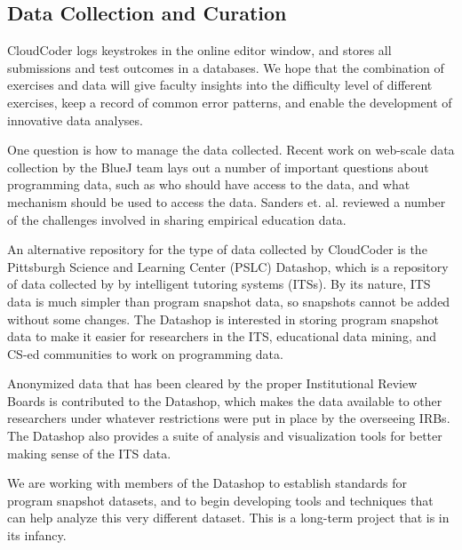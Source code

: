 \documentclass{sig-alternate}
\begin{document}
\subsection{Data Collection and Curation}

CloudCoder logs keystrokes in the online editor window, and 
stores all submissions and test outcomes in a databases.
We hope that the combination of exercises and data will give faculty
insights into the difficulty level of different exercises, keep a
record of common error patterns, and enable the development of
innovative data analyses.


One question is how to manage the data collected.  
Recent work on web-scale data collection by the BlueJ team
\cite{Utting:2012:WDG:2361276.2361278} lays out a number of important
questions about programming data, such as who should have access to the data, and what
mechanism should be used to access the data.  Sanders
et. al. \cite{Sanders:2008:DSE:1404520.1404534} reviewed a number of
the challenges involved in sharing empirical education data.  

An alternative repository for the type of data collected by CloudCoder
is the Pittsburgh Science and Learning Center (PSLC) Datashop, which
is a repository of data collected by by intelligent tutoring
systems (ITSs).  By its nature, ITS data is much simpler than program
snapshot data, so snapshots cannot be added without some changes.
The Datashop is interested in storing program
snapshot data to make it easier for researchers in the ITS, educational data
mining, and CS-ed communities to work on programming data.

Anonymized data that has been cleared by the proper Institutional
Review Boards is contributed to the Datashop, which
makes the data available to other researchers under whatever
restrictions were put in place by the overseeing IRBs.  The Datashop also
provides a suite of analysis and visualization tools for better making
sense of the ITS data.

We are working with members of the Datashop to establish standards for
program snapshot datasets, and to begin developing tools and
techniques that can help analyze this very different dataset.  This is
a long-term project that is in its infancy.


\end{document}
